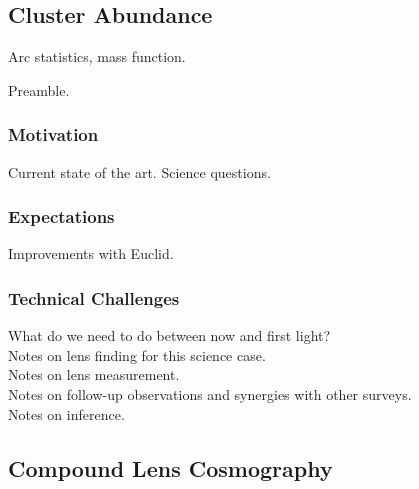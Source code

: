 \documentclass[twocolumn]{svjour3}
\begin{document}

\subsection{Cluster Abundance}



Arc statistics, mass function.

Preamble.

\subsubsection{Motivation}
Current state of the art. Science questions.\\

\subsubsection{Expectations}
Improvements with Euclid.\\

\subsubsection{Technical Challenges}

What do we need to do between now and first light?\\

Notes on lens finding for this science case.\\

Notes on lens measurement.\\

Notes on follow-up observations and synergies with other surveys.\\

Notes on inference.\\



\subsection{Compound Lens Cosmography}


\\
\end{document}
